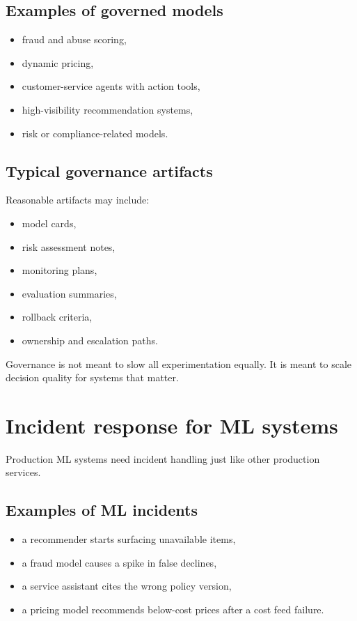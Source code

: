 \subsection{Examples of governed models}
\begin{itemize}
  \item fraud and abuse scoring,
  \item dynamic pricing,
  \item customer-service agents with action tools,
  \item high-visibility recommendation systems,
  \item risk or compliance-related models.
\end{itemize}

\subsection{Typical governance artifacts}
Reasonable artifacts may include:
\begin{itemize}
  \item model cards,
  \item risk assessment notes,
  \item monitoring plans,
  \item evaluation summaries,
  \item rollback criteria,
  \item ownership and escalation paths.
\end{itemize}

Governance is not meant to slow all experimentation equally.
It is meant to scale decision quality for systems that matter.

\section{Incident response for ML systems}
Production ML systems need incident handling just like other production services.

\subsection{Examples of ML incidents}
\begin{itemize}
  \item a recommender starts surfacing unavailable items,
  \item a fraud model causes a spike in false declines,
  \item a service assistant cites the wrong policy version,
  \item a pricing model recommends below-cost prices after a cost feed failure.
\end{itemize}

